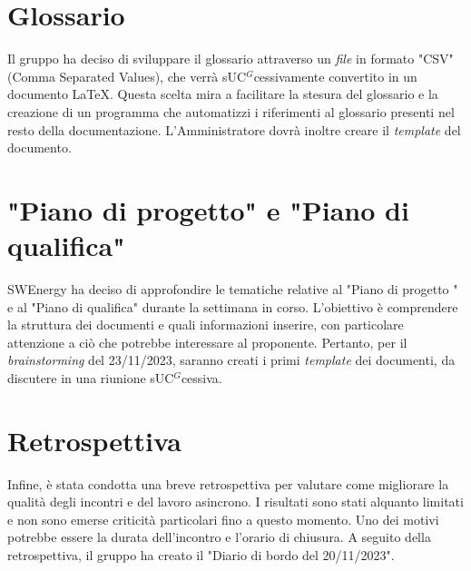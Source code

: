 \section{Glossario}

Il gruppo ha deciso di sviluppare il glossario attraverso un \textit{file} in
formato "CSV" (Comma Separated Values), che verrà s\gls{UC}$^G$cessivamente convertito
in un documento \LaTeX{}. Questa scelta mira a facilitare la stesura del
glossario e la creazione di un programma che automatizzi i riferimenti al
glossario presenti nel resto della documentazione. L'Amministratore dovrà
inoltre creare il \textit{template} del documento.

\section{"Piano di progetto" e "Piano di qualifica"}

SWEnergy ha deciso di approfondire le tematiche relative al "Piano di progetto
" e al "Piano di qualifica" durante la settimana in corso. L'obiettivo è
comprendere la struttura dei documenti e quali informazioni inserire, con
particolare attenzione a ciò che potrebbe interessare al proponente. Pertanto,
per il \textit{brainstorming} del 23/11/2023, saranno creati i primi \textit{
	template} dei documenti, da discutere in una riunione s\gls{UC}$^G$cessiva.

\section{Retrospettiva}

Infine, è stata condotta una breve retrospettiva per valutare come migliorare
la qualità degli incontri e del lavoro asincrono. I risultati sono stati
alquanto limitati e non sono emerse criticità particolari fino a questo momento.
Uno dei motivi potrebbe essere la durata dell'incontro e l'orario di chiusura.
A seguito della retrospettiva, il gruppo ha creato il "Diario di bordo del
20/11/2023".
